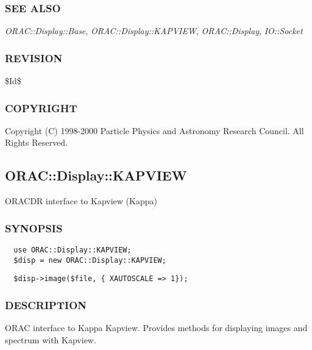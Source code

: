 \subsubsection*{SEE ALSO\label{ORAC::Display::GAIA_SEE_ALSO}}


\emph{ORAC::Display::Base}, \emph{ORAC::Display::KAPVIEW}, \emph{ORAC::Display},
\emph{IO::Socket}

\subsubsection*{REVISION\label{ORAC::Display::GAIA_REVISION}}


\$Id\$

\subsubsection*{COPYRIGHT\label{ORAC::Display::GAIA_COPYRIGHT}}


Copyright (C) 1998-2000 Particle Physics and Astronomy Research
Council. All Rights Reserved.

\subsection{ORAC::Display::KAPVIEW\label{ORAC::Display::KAPVIEW}}


ORACDR interface to Kapview (Kappa)

\subsubsection*{SYNOPSIS\label{ORAC::Display::KAPVIEW_SYNOPSIS}}
\begin{verbatim}
  use ORAC::Display::KAPVIEW;
  $disp = new ORAC::Display::KAPVIEW;
\end{verbatim}
\begin{verbatim}
  $disp->image($file, { XAUTOSCALE => 1});
\end{verbatim}
\subsubsection*{DESCRIPTION\label{ORAC::Display::KAPVIEW_DESCRIPTION}}


ORAC interface to Kappa Kapview. Provides methods for displaying images
and spectrum with Kapview.



